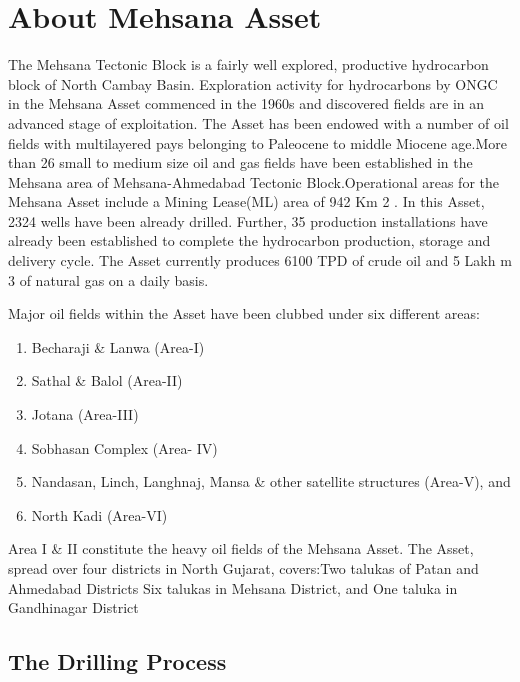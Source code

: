 \chapter{About Mehsana Asset}

The Mehsana Tectonic Block is a fairly well explored, productive hydrocarbon block of North Cambay Basin. Exploration activity for hydrocarbons by ONGC in the Mehsana Asset commenced in the 1960s and discovered fields are in an advanced stage of exploitation. The Asset has been endowed with a number of oil fields with multilayered pays belonging to Paleocene to middle Miocene age.More than 26 small to medium size oil and gas fields have been established in the Mehsana area of Mehsana-Ahmedabad Tectonic Block.Operational areas for the Mehsana Asset include a Mining Lease(ML) area of 942 Km 2 . In this Asset, 2324 wells have been already
drilled. Further, 35 production installations have already been established to complete the hydrocarbon production, storage and delivery cycle. The Asset currently produces 6100 TPD of crude oil and 5 Lakh m 3 of natural gas on a daily basis.

\vspace{1em}

\noindent Major oil fields within the Asset have been clubbed under six different areas:

\begin{enumerate}
\item Becharaji \& Lanwa (Area-I)

\item Sathal \& Balol (Area-II)

\item Jotana (Area-III)

\item Sobhasan Complex (Area- IV)

\item Nandasan, Linch, Langhnaj, Mansa \& other satellite structures (Area-V), and

\item North Kadi (Area-VI)

\end{enumerate}

\noindent Area I \& II constitute the heavy oil fields of the Mehsana Asset.
The Asset, spread over four districts in North Gujarat, covers:Two talukas of Patan and Ahmedabad Districts Six talukas in Mehsana District,
and One taluka in Gandhinagar District

\section{The Drilling Process}

